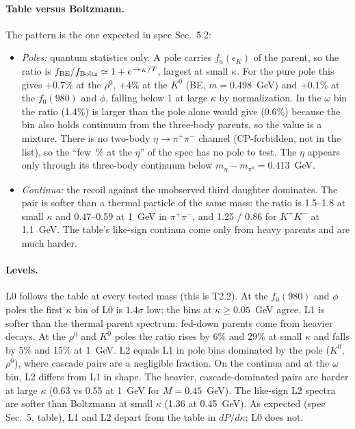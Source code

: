 \documentclass[11pt,a4paper]{article}
\begin{document}
\paragraph{Table versus Boltzmann.} The pattern is the one expected in spec Sec.~5.2:
\begin{itemize}\itemsep1pt
\item \emph{Poles:} quantum statistics only. A pole carries $f_a(\epsilon_K)$ of the parent, so the
  ratio is $f_{\rm BE}/f_{\rm Boltz}\simeq1+e^{-\epsilon_K/T}$, largest at small $\kappa$. For the
  pure pole this gives $+0.7\%$ at the $\rho^0$, $+4\%$ at the $K^0$ (BE, $m=0.498$~GeV) and $+0.1\%$ at
  the $f_0(980)$ and $\phi$, falling below 1 at large $\kappa$ by normalization. In the $\omega$ bin
  the ratio (1.4\%) is larger than the pole alone would give (0.6\%) because the bin also holds
  continuum from the three-body parents, so the value is a mixture.
  There is no two-body $\eta\to\pi^+\pi^-$ channel (CP-forbidden, not in the list), so the
  ``few~\% at the $\eta$'' of the spec has no pole to test. The $\eta$ appears only through its
  three-body continuum below $m_\eta-m_{\pi^0}=0.413$~GeV.
\item \emph{Continua:} the recoil against the unobserved third daughter dominates. The pair is softer
  than a thermal particle of the same mass: the ratio is 1.5--1.8 at small $\kappa$ and 0.47--0.59
  at 1~GeV in $\pi^+\pi^-$, and 1.25 / 0.86 for $K^+K^-$ at 1.1~GeV. The table's like-sign continua
  come only from heavy parents and are much harder.
\end{itemize}

\paragraph{Levels.} L0 follows the table at every tested mass (this is T2.2). At the $f_0(980)$ and
$\phi$ poles the first $\kappa$ bin of L0 is $1.4\sigma$ low; the bins at $\kappa\ge0.05$~GeV agree.
L1 is softer than the thermal parent spectrum: fed-down parents come from heavier decays. At the
$\rho^0$ and $K^0$ poles the ratio rises by 6\% and 29\% at small $\kappa$ and falls by 5\% and 15\%
at 1~GeV. L2 equals L1 in pole bins dominated by the pole ($K^0$, $\rho^0$), where cascade
pairs are a negligible fraction. On the continua and at the $\omega$ bin, L2 differs from L1 in
shape. The heavier, cascade-dominated pairs are harder at large $\kappa$ (0.63 vs 0.55 at 1~GeV
for $M=0.45$~GeV). The like-sign L2 spectra are softer than Boltzmann at small $\kappa$ (1.36 at
0.45~GeV). As expected (spec Sec.~5, table), L1 and L2 depart from the table in $dP/d\kappa$; L0
does not.
\end{document}
